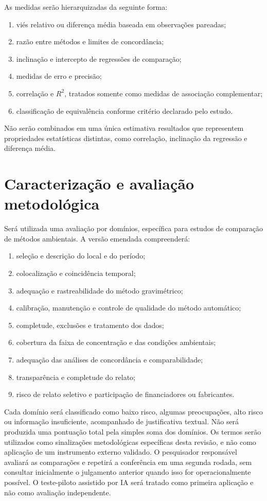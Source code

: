 \documentclass[11pt,a4paper]{article}
\begin{document}
As medidas serão hierarquizadas da seguinte forma:

\begin{enumerate}
  \item viés relativo ou diferença média baseada em observações pareadas;
  \item razão entre métodos e limites de concordância;
  \item inclinação e intercepto de regressões de comparação;
  \item medidas de erro e precisão;
  \item correlação e $R^2$, tratados somente como medidas de associação complementar;
  \item classificação de equivalência conforme critério declarado pelo estudo.
\end{enumerate}

Não serão combinados em uma única estimativa resultados que representem propriedades
estatísticas distintas, como correlação, inclinação da regressão e diferença média.

\section{Caracterização e avaliação metodológica}

Será utilizada uma avaliação por domínios, específica para estudos de comparação de
métodos ambientais. A versão emendada compreenderá:

\begin{enumerate}
  \item seleção e descrição do local e do período;
  \item colocalização e coincidência temporal;
  \item adequação e rastreabilidade do método gravimétrico;
  \item calibração, manutenção e controle de qualidade do método automático;
  \item completude, exclusões e tratamento dos dados;
  \item cobertura da faixa de concentração e das condições ambientais;
  \item adequação das análises de concordância e comparabilidade;
  \item transparência e completude do relato;
  \item risco de relato seletivo e participação de financiadores ou fabricantes.
\end{enumerate}

Cada domínio será classificado como baixo risco, algumas preocupações, alto risco ou
informação insuficiente, acompanhado de justificativa textual. Não será produzida uma
pontuação total pela simples soma dos domínios. Os termos serão utilizados como
sinalizações metodológicas específicas desta revisão, e não como aplicação de um
instrumento externo validado. O pesquisador responsável avaliará as comparações e
repetirá a conferência em uma segunda rodada, sem consultar inicialmente o julgamento
anterior quando isso for operacionalmente possível. O teste-piloto assistido por IA
será tratado como primeira aplicação e não como avaliação independente.
\end{document}
